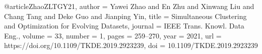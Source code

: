 @article{ZhaoZLTGY21,
  author    = {Yawei Zhao and En Zhu and Xinwang Liu and Chang Tang and Deke Guo and Jianping Yin},
  title     = {Simultaneous Clustering and Optimization for Evolving Datasets},
  journal   = {{IEEE} Trans. Knowl. Data Eng.},
  volume    = {33},
  number    = {1},
  pages     = {259--270},
  year      = {2021},
  url       = {https://doi.org/10.1109/TKDE.2019.2923239},
  doi       = {10.1109/TKDE.2019.2923239}
}